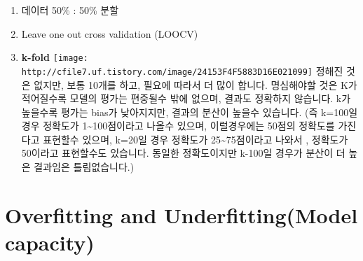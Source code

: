 \documentclass[11pt]{article}
\makeatletter
\def\maxwidth{\ifdim\Gin@nat@width>\linewidth\linewidth
    \else\Gin@nat@width\fi}
\let\Oldincludegraphics\includegraphics
\renewcommand{\includegraphics}[1]{\Oldincludegraphics[width=.8\maxwidth]{#1}}
\makeatother
\begin{document}
\begin{enumerate}
\def\labelenumi{\arabic{enumi}.}
\item
  데이터 50\% : 50\% 분할
\item
  Leave one out cross validation (LOOCV)
\item
  \textbf{k-fold}
  \texttt{[image: http://cfile7.uf.tistory.com/image/24153F4F5883D16E021099]}
  정해진 것은 없지만, 보통 10개를 하고, 필요에 따라서 더 많이 합니다.
  명심해야할 것은 K가 적어질수록 모델의 평가는 편중될수 밖에 없으며,
  결과도 정확하지 않습니다. k가 높을수록 평가는 bias가 낮아지지만,
  결과의 분산이 높을수 있습니다. (즉 k=100일 경우 정확도가
  1\textasciitilde{}100점이라고 나올수 있으며, 이럴경우에는 50점의
  정확도를 가진다고 표현할수 있으며, k=20일 경우 정확도가
  25\textasciitilde{}75점이라고 나와서 , 정확도가 50이라고 표현할수도
  있습니다. 동일한 정확도이지만 k-100일 경우가 분산이 더 높은 결과임은
  틀림없습니다.)
\end{enumerate}

    \section{Overfitting and Underfitting(Model
capacity)}\label{overfitting-and-underfittingmodel-capacity}


    
    
    
    
\end{document}
